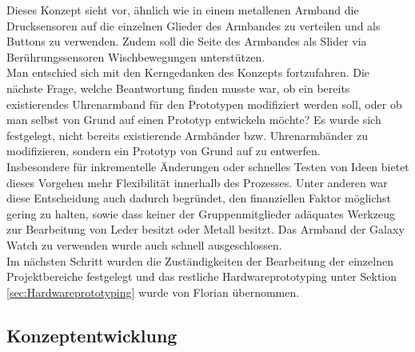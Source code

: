 \documentclass[11pt, a4paper]{article}
\begin{document}
Dieses Konzept sieht vor, ähnlich wie in einem metallenen Armband die Drucksensoren auf die einzelnen Glieder des Armbandes zu verteilen und als Buttons zu verwenden. 
Zudem soll die Seite des Armbandes als Slider via Berührungssensoren Wischbewegungen unterstützen. \\
Man entschied sich mit den Kerngedanken des Konzepts fortzufahren. 
Die nächste Frage, welche Beantwortung finden musste war, ob ein bereits existierendes Uhrenarmband für den Prototypen modifiziert werden soll, oder ob man selbst von Grund auf einen Prototyp entwickeln möchte?
Es wurde sich festgelegt, nicht bereits existierende Armbänder bzw. Uhrenarmbänder zu modifizieren, sondern ein Prototyp von Grund auf zu entwerfen.\\
Insbesondere für inkrementelle Änderungen oder schnelles Testen von Ideen bietet dieses Vorgehen mehr Flexibilität innerhalb des Prozesses. 
Unter anderen war diese Entscheidung auch dadurch begründet, den finanziellen Faktor möglichst gering zu halten, sowie dass keiner der Gruppenmitglieder adäquates Werkzeug zur Bearbeitung von Leder besitzt oder Metall besitzt. Das Armband der Galaxy Watch zu verwenden wurde auch schnell ausgeschlossen.\\
Im nächsten Schritt wurden die Zuständigkeiten der Bearbeitung der einzelnen Projektbereiche festgelegt und das restliche Hardwareprototyping unter Sektion \ref{sec:Hardwareprototyping} wurde von Florian übernommen.

\subsection{Konzeptentwicklung}
\label{sec:hw_proc_concept2}
\end{document}
